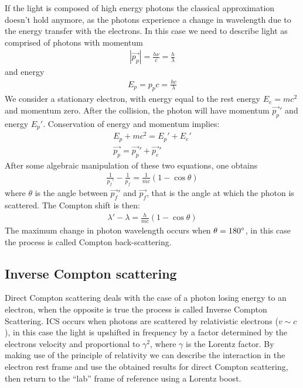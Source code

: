 If the light is composed of high energy photons the classical approximation doesn't hold anymore, as the photons experience a change in wavelength due to the energy transfer with the electrons. In this case we need to describe light as comprised of photons with momentum
\begin{align}
\left|\vec{p_p}\right| = \frac{h\nu}{c} = \frac{h}{\lambda}
\end{align}
and energy
\begin{align}
E_p = p_p c = \frac{hc}{\lambda}
\end{align}
We consider a stationary electron, with energy equal to the rest energy $E_e = m c^2$ and momentum zero.
After the collision, the photon will have momentum  $\vec{p_p}'$ and energy $E_p'$.
Conservation of energy and momentum implies:
\begin{align}
E_p + m c^2 = E_p' + E_e' \\
\vec{p_p} = \vec{p_p}' + \vec{p_e}'
\end{align}
After some algebraic manipulation of these two equations, one obtains
\begin{align}
\frac{1}{p_f'}-\frac{1}{p_f} = \frac{1}{m c} \left( 1-\cos\theta\right)
\end{align}
where $\theta$ is the angle between $\vec{p_f}'$ and $\vec{p_f}$, that is the angle at which the photon is scattered. The Compton shift is then:
\begin{align}
\lambda'-\lambda = \frac{h}{m c} \left( 1-\cos\theta\right)
\end{align}
The maximum change in photon wavelength occurs when $\theta = 180\degree$, in this case the process is called Compton back-scattering.

\subsection{Inverse Compton scattering}
Direct Compton scattering deals with the case of a photon losing energy to an electron, when the opposite is true the process is called Inverse Compton Scattering. ICS occurs when photons are scattered by relativistic electrons ($v\sim c$), in this case the light is upshifted in frequency by a factor determined by the electrons velocity and proportional to $\gamma^2$, where $\gamma$ is the Lorentz factor. 
By making use of the principle of relativity we can describe the interaction in the electron rest frame and use the obtained results for direct Compton scattering, then return to the ``lab'' frame of reference using a Lorentz boost.


